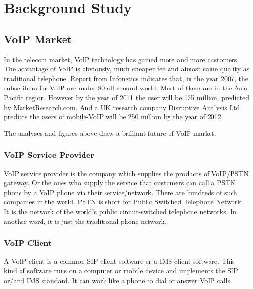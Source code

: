 \chapter{Background Study}
\label{sec:BackgroundStudy}


\section{VoIP Market}
\label{sec:BackgroundStudy:VoIPMarket}

In the telecom market, VoIP technology has gained more and more customers. The advantage of VoIP is obviously, much cheaper fee and almost same quality as traditional telephone.  Report from \textsf{Infonetics} indicates that, in the year 2007, the subscribers for VoIP are under 80 all around world. Most of them are in the Asia Pacific region. However by the year of 2011 the user will be 135 million, predicted by \textsf{MarketResearch.com}. And a UK research company \textsf{Disruptive Analysis Ltd.} predicts the users of mobile-VoIP will be 250 million by the year of 2012.\cite{StateOfTheVoIPMarket2008}

The analyses and figures above draw a brilliant future of VoIP market.  

\subsection{VoIP Service Provider}
\label{sec:BackgroundStudy:VoIPMarket:VoIPServiceProvider}

VoIP service provider is the company which supplies the products of VoIP/PSTN gateway. Or the ones who supply the service that customers can call a PSTN phone by a VoIP phone via their service/network. There are hundreds of such companies in the world. PSTN\label{sym:PSTN} is short for Public Switched Telephone Network. It is the network of the world's public circuit-switched telephone networks. In another word, it is just the traditional phone network.


\subsection{VoIP Client}
\label{sec:BackgroundStudy:VoIPMarket:VoIPClient}

A VoIP client is a common SIP client software or a IMS client software. This kind of software runs on a computer or mobile device and implements the SIP or/and IMS standard. It can work like a phone to dial or answer VoIP calls.  

